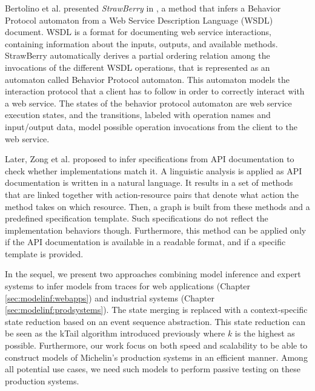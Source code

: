 Bertolino et al. presented \textit{StrawBerry} in
\cite{Bertolino:2009:ASB:1595696.1595719}, a method that infers a
Behavior Protocol automaton from a Web Service Description
Language (WSDL) document.  WSDL is a format for documenting web
service interactions, containing information about the inputs,
outputs, and available methods. StrawBerry automatically derives a
partial ordering relation among the invocations of the different
WSDL operations, that is represented as an automaton called
Behavior Protocol automaton.  This automaton models the
interaction protocol that a client has to follow in order to
correctly interact with a web service.  The states of the
behavior protocol automaton are web service execution states, and
the transitions, labeled with operation names and input/output
data, model possible operation invocations from the client to the
web service.

Later, Zong et al. \cite{ZhongZXM11} proposed to infer
specifications from API documentation to check whether
implementations match it. A linguistic analysis is applied as API
documentation is written in a natural language. It results in a
set of methods that are linked together with action-resource
pairs that denote what action the method takes on which resource.
Then, a graph is built from these methods and a predefined
specification template. Such specifications do not reflect the
implementation behaviors though. Furthermore, this method can be
applied only if the API documentation is available in a readable
format, and if a specific template is provided.

In the sequel, we present two approaches combining model
inference and expert systems to infer models from traces for web
applications (Chapter \ref{sec:modelinf:webapps}) and industrial
systems (Chapter \ref{sec:modelinf:prodsystems}). The state
merging is replaced with a context-specific state reduction based
on an event sequence abstraction. This state reduction can be
seen as the kTail algorithm introduced previously where $k$ is
the highest as possible. Furthermore, our work focus on both
speed and scalability to be able to construct models of
Michelin's production systems in an efficient manner. Among all
potential use cases, we need such models to perform passive
testing on these production systems.
